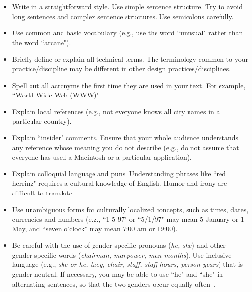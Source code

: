 \documentclass{chi-ext}
\begin{document}
\begin{itemize}\compresslist
\item 	
Write in a straightforward style. 
Use simple sentence structure. 
Try to avoid long sentences and complex sentence structures. 
Use semicolons carefully.
\item 	
Use common and basic vocabulary (e.g., use the word ``unusual" rather than the word ``arcane").
\item 	
Briefly define or explain all technical terms. 
The terminology common to your practice/discipline may be different in other design practices/disciplines.
\item 	
Spell out all acronyms the first time they are used in your text. 
For example, ``World Wide Web (WWW)".
\item 	
Explain local references (e.g., not everyone knows all city names in a particular country).
\item 	
Explain ``insider" comments. 
Ensure that your whole audience understands any reference whose meaning you do not describe (e.g., do not assume that everyone has used a Macintosh or a particular application).
\item 	
Explain colloquial language and puns. 
Understanding phrases like ``red herring" requires a cultural knowledge of English. 
Humor and irony are difficult to translate.
\item 	
Use unambiguous forms for culturally localized concepts, such as times, dates, currencies and numbers (e.g., ``1-5-97" or ``5/1/97" may mean 5 January or 1 May, and ``seven o'clock" may mean 7:00 am or 19:00).

\item 	
Be careful with the use of gender-specific pronouns (\emph{he, she}) and other gender-specific words (\emph{chairman, manpower, man-months}). 
Use inclusive language (e.g., \emph{she or he, they, chair, staff, staff-hours, person-years}) that is gender-neutral. 
If necessary, you may be able to use ``he" and ``she" in alternating sentences, so that the two genders occur equally often~\cite{Schwartz95}. 
\end{itemize}
\end{document}
